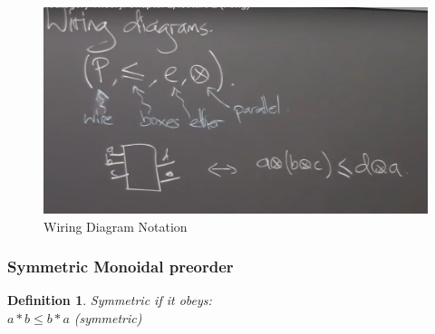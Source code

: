 \documentclass{article}
\newtheorem{defn}[thm]{Definition} %
\begin{document}
\begin{figure}[h!]
    \centering
    \includegraphics[scale=0.5]{./images/7.jpg}
    \caption{Wiring Diagram Notation}
    \label{fig:my_label}
\end{figure}

\subsubsection{Symmetric Monoidal preorder} 
\begin{defn}
    Symmetric if it obeys: \\
    $a*b \leq b*a$ (symmetric)
\end{defn}
\end{document}
